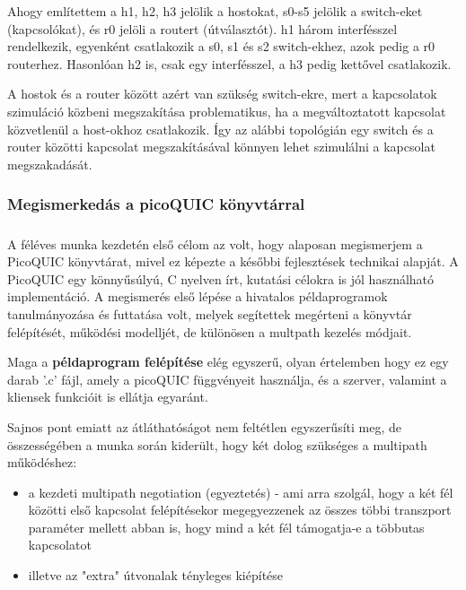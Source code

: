 \documentclass[a4paper,oneside]{article}
\begin{document}
Ahogy említettem a h1, h2, h3 jelölik a hostokat, s0-s5 jelölik a switch-eket (kapcsolókat), és r0 jelöli a routert (útválasztót).
h1 három interfésszel rendelkezik, egyenként csatlakozik a s0, s1 és s2 switch-ekhez, azok pedig a r0 routerhez.
Hasonlóan h2 is, csak egy interfésszel, a h3 pedig kettővel csatlakozik.

A hostok és a router között azért van szükség switch-ekre,
mert a kapcsolatok szimuláció közbeni megszakítása problematikus, ha a megváltoztatott kapcsolat közvetlenül a host-okhoz csatlakozik.
Így az alábbi topológián egy switch és a router közötti kapcsolat megszakításával könnyen lehet szimulálni a kapcsolat megszakadását.

\subsubsection{Megismerkedás a picoQUIC könyvtárral}

\subparagraph{}
A féléves munka kezdetén első célom az volt, hogy alaposan megismerjem a 
PicoQUIC könyvtárat, mivel ez képezte a későbbi 
fejlesztések technikai alapját. A PicoQUIC egy könnyűsúlyú, C nyelven írt, kutatási 
célokra is jól használható implementáció. A megismerés első lépése a hivatalos példaprogramok 
tanulmányozása és futtatása volt, melyek segítettek megérteni a könyvtár felépítését, 
működési modelljét, de különösen a multpath kezelés módjait.

Maga a \textbf{példaprogram felépítése} elég egyszerű, olyan értelemben hogy ez egy darab '.c' fájl, amely a picoQUIC függvényeit használja, 
és a szerver, valamint a kliensek funkcióit is ellátja egyaránt. 

Sajnos pont emiatt az átláthatóságot nem feltétlen egyszerűsíti meg, de összességében 
a munka során kiderült, hogy két dolog szükséges a multipath működéshez:

\begin{itemize}

  \item a kezdeti multipath negotiation (egyeztetés) - ami arra szolgál, hogy a két fél közötti első
  kapcsolat felépítésekor megegyezzenek az összes többi transzport paraméter mellett abban is, 
  hogy mind a két fél támogatja-e a többutas kapcsolatot

  \item illetve az "extra" útvonalak tényleges kiépítése

\end{itemize}
\end{document}
